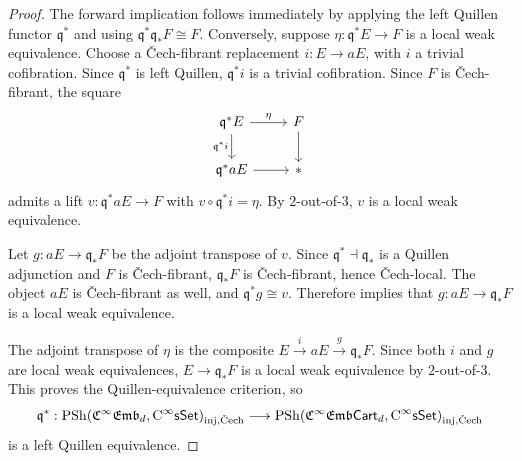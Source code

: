 \documentclass{amsart}
\newcommand{\cat}[1]{\mathsf{#1}}
\newcommand{\sset}{\cat{sSet}}
\newcommand{\inj}{\textnormal{inj}}
\newcommand{\Cech}{\textnormal{\v{C}ech}}
\newcommand{\CsSet}{\textnormal{C}^{\infty}\sset}
\newcommand{\femb}[1]{\mathfrak{C}^{\infty}\mathfrak{Emb}_{#1}}
\newcommand{\fembcart}[1]{\mathfrak{C}^{\infty}\mathfrak{Emb}\cat{Cart}_{#1}}
\newcommand{\psh}{\mathrm{PSh}}
\theoremstyle{definition}
\numberwithin{equation}{subsection}
\numberwithin{subsubsection}{subsection}
\begin{document}
\begin{proof}
  The forward implication follows immediately by applying the left
  Quillen functor \(\mathfrak{q}^{*}\) and using
  \(\mathfrak{q}^{*}\mathfrak{q}_{*}F\cong F\). Conversely, suppose
  \(\eta:\mathfrak{q}^{*}E\to F\) is a local weak equivalence. Choose a
  \v{C}ech-fibrant replacement \(i:E\to aE\), with \(i\) a trivial
  cofibration. Since \(\mathfrak{q}^{*}\) is left Quillen,
  \(\mathfrak{q}^{*}i\) is a trivial cofibration. Since \(F\) is
  \v{C}ech-fibrant, the square
  \[
    \begin{tikzcd}
      \mathfrak{q}^{*}E
      \arrow[r,"\eta"]
      \arrow[d,"\mathfrak{q}^{*}i"']
      &
      F
      \arrow[d]
      \\
      \mathfrak{q}^{*}aE
      \arrow[r]
      &
      *
    \end{tikzcd}
  \]
  admits a lift \(v:\mathfrak{q}^{*}aE\to F\) with
  \(v\circ \mathfrak{q}^{*}i=\eta\). By \(2\)-out-of-\(3\), \(v\) is a
  local weak equivalence.

  Let \(g:aE\to \mathfrak{q}_{*}F\) be the adjoint transpose of \(v\). Since
  \(\mathfrak{q}^{*}\dashv \mathfrak{q}_{*}\) is a Quillen adjunction and \(F\)
  is \v{C}ech-fibrant, \(\mathfrak{q}_{*}F\) is \v{C}ech-fibrant, hence
  \v{C}ech-local. The object \(aE\) is \v{C}ech-fibrant as well, and
  \(\mathfrak{q}^{*}g\cong v\). Therefore
   implies that
  \(g:aE\to \mathfrak{q}_{*}F\) is a local weak equivalence.

  The adjoint transpose of \(\eta\) is the composite
  \(E\xrightarrow{i}aE\xrightarrow{g}\mathfrak{q}_{*}F\). Since both \(i\) and
  \(g\) are local weak equivalences, \(E\to\mathfrak{q}_{*}F\) is a local weak
  equivalence by \(2\)-out-of-\(3\). This proves the
  Quillen-equivalence criterion, so
  \[
    \mathfrak{q}^{*}:
    \psh(\femb{d},\CsSet)_{\inj,\Cech}
    \longrightarrow
    \psh(\fembcart{d},\CsSet)_{\inj,\Cech}
  \]
  is a left Quillen equivalence.
\end{proof}
\end{document}
